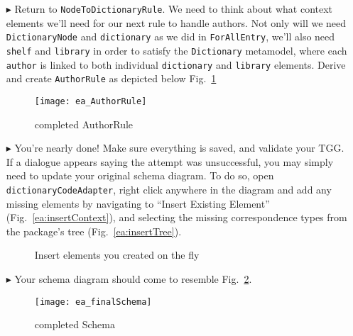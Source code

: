 \begin{itemize}
\item[$\blacktriangleright$] Return to \texttt{NodeToDictionaryRule}. We need to think about what context elements we'll need for our next rule to handle
authors. Not only will we need \texttt{DictionaryNode} and \texttt{dictionary} as we did in \texttt{ForAllEntry}, we'll also need \texttt{shelf} and
\texttt{library} in order to satisfy the \texttt{Dictionary} metamodel, where each \texttt{author} is linked to both individual \texttt{dictionary} and
\texttt{library} elements. Derive and create \texttt{AuthorRule} as depicted below Fig.~\ref{ea:AuthorRule}

\begin{figure}[htbp]
\begin{center}
  \texttt{[image: ea\_AuthorRule]}
  \caption{completed AuthorRule}
  \label{ea:AuthorRule}
\end{center}
\end{figure}

\item[$\blacktriangleright$] You're nearly done! Make sure everything is saved, and validate your TGG. If a dialogue appears saying the attempt was
unsuccessful, you may simply need to update your original schema diagram. To do so, open \texttt{dictionaryCodeAdapter}, right click anywhere in the diagram and
add any missing elements by navigating to ``Insert Existing Element'' (Fig.~\ref{ea:insertContext}), and selecting the missing correspondence types from the package's
tree (Fig.~\ref{ea:insertTree}).

\begin{figure}[htbp]
   \centering
      \caption{Insert elements you created on the fly}
\end{figure}

\item[$\blacktriangleright$] Your schema diagram should come to resemble Fig.~\ref{ea:Schema_Complete}.

\begin{figure}[htbp]
\begin{center}
  \texttt{[image: ea\_finalSchema]}
  \caption{completed Schema}
  \label{ea:Schema_Complete}
\end{center}
\end{figure}


\end{itemize}
